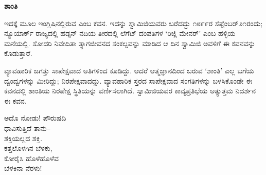 \begin{myquote}
\end{myquote}

\begin{myquote}
\end{myquote}

\begin{myquote}
\end{myquote}

\begin{myquote}
\end{myquote}

\selectkan

\begin{center}
\textbf{ಶಾಂತಿ}
\end{center}

ಇದಕ್ಕೆ ಮೂಲ ಇಂಗ್ಲಿಷಿನಲ್ಲಿರುವ  ಎಂಬ ಕವನ. ಇದನ್ನು ಸ್ವಾಮಿಜಿಯವರು ಬರೆದದ್ದು ೧೮೯೯ರ ಸೆಪ್ಟೆಂಬರ್೨೧ರಂದು; ನ್ಯೂಯಾರ್ಕ್ ರಾಜ್ಯದಲ್ಲಿ ಹಡ್ಸನ್ ನದಿಯ ತೀರದಲ್ಲಿ ಲೆಗೆಟ್ ದಂಪತಿಗಳ ‘ರಿಜ್ಲಿ ಮೇನರ್’ ಎಂಬ ಹಳ್ಳಿಯ ಮನೆಯಲ್ಲಿ. ಸೋದರಿ ನಿವೇದಿತಾ ತ್ಯಾಗಜೀವನದ ಸಂಕಲ್ಪವನ್ನು ಮಾಡಿದ ಆ ದಿನ ಸ್ವಾಮಿಜಿ ಅವಳಿಗೆ ಈ ಕವನವನ್ನು ಕೊಡುತ್ತಾರೆ.

ವ್ಯಾವಹಾರಿಕ ಜಗತ್ತು ಸಾಪೇಕ್ಷವಾದ ಅತಿಗಳಿಂದ ಕೂಡಿದ್ದು. ಆದರೆ ಆತ್ಮಜ್ಞಾನದಿಂದ ಬರುವ ‘ಶಾಂತಿ’ ಎಲ್ಲ ಬಗೆಯ ದ್ವಂದ್ವಗಳನ್ನು ಮೀರಿದ್ದು; ನಿರಪೇಕ್ಷವಾದದ್ದು. ವ್ಯಾವಹಾರಿಕ ಸ್ತರದ ಸಾಪೇಕ್ಷವಾದ ಸಂಗತಿಗಳನ್ನು ಬಳಸಿಕೊಂಡೇ ಈ ಕವನದಲ್ಲಿ ಶಾಂತಿಯ ನಿರಪೇಕ್ಷ ಸ್ಥಿತಿಯನ್ನು ವರ್ಣಿಸಲಾಗಿದೆ. ಸ್ವಾಮಿಜಿಯವರ ಕಾವ್ಯಪ್ರತಿಭೆಯ ಅತ್ಯುತ್ತಮ ನಿದರ್ಶನ ಈ ಕವನ.

\begin{myquote}
ಅದೊ ನೋಡು! ಪೌರುಷದಿ\\ಧಾವಿಸುತ್ತಿದೆ ತಾನು–\\ಶಕ್ತಿಯಲ್ಲದ ಶಕ್ತಿ.\\ಕತ್ತಲೊಳಗಿನ ಬೆಳಕು,\\ಕೋರೈಸಿ ಹೊಳೆಹೊಳೆವ\\ಬೆಳಕಿನಾ ನೆರಳು!
\end{myquote}

